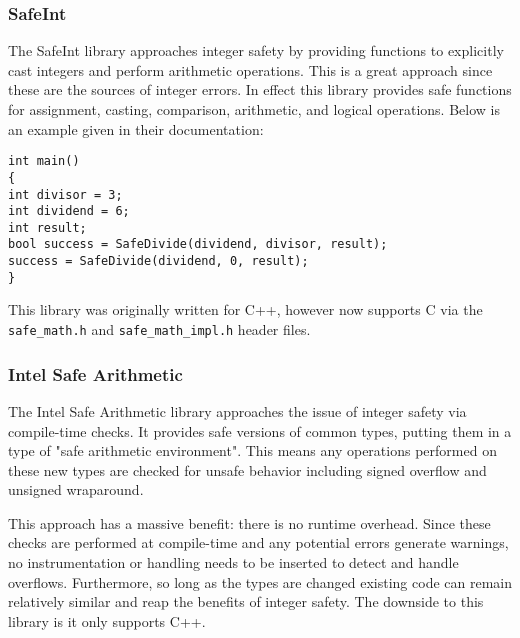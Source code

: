 \subsubsection{SafeInt}

The SafeInt library approaches integer safety by providing functions to explicitly cast integers and perform arithmetic operations. This is a great approach since these are the sources of integer errors. In effect this library provides safe functions for assignment, casting, comparison, arithmetic, and logical operations. Below is an example given in their documentation:

\begin{flushleft}
\begin{minipage}{\linewidth}
\texttt{int main()\\
\{\\
\hspace*{1.5em}int divisor = 3;\\
\hspace*{1.5em}int dividend = 6;\\
\hspace*{1.5em}int result;\\
\hspace*{1.5em}bool success = SafeDivide(dividend, divisor, result);\\
\hspace*{1.5em}success = SafeDivide(dividend, 0, result);\\
\}
}
\end{minipage}
\end{flushleft}


This library was originally written for C++, however now supports C via the \texttt{safe\_math.h} and \texttt{safe\_math\_impl.h} header files.

\subsubsection{Intel Safe Arithmetic}

The Intel Safe Arithmetic library approaches the issue of integer safety via compile-time checks. It provides safe versions of common types, putting them in a type of "safe arithmetic environment". This means any operations performed on these new types are checked for unsafe behavior including signed overflow and unsigned wraparound.

This approach has a massive benefit: there is no runtime overhead. Since these checks are performed at compile-time and any potential errors generate warnings, no instrumentation or handling needs to be inserted to detect and handle overflows. Furthermore, so long as the types are changed existing code can remain relatively similar and reap the benefits of integer safety. The downside to this library is it only supports C++.

